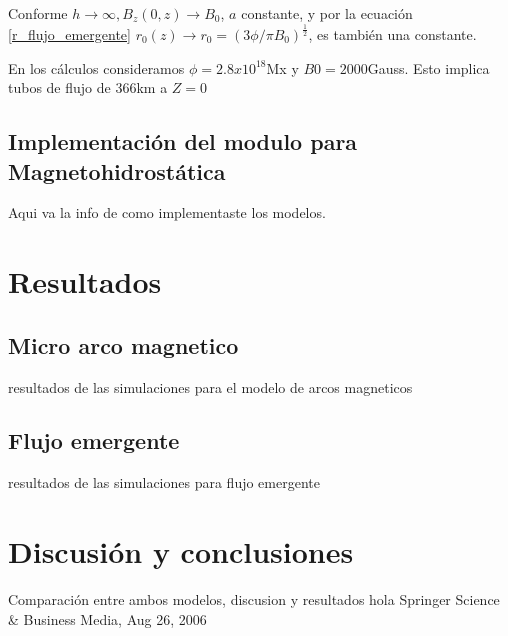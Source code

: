 \documentclass[9pt]{book}
\begin{document}
Conforme $h\rightarrow \infty , B_z(0,z) \rightarrow B_0$, $a$ constante, y por la ecuaci\'on \ref{r_flujo_emergente} $r_0(z) \rightarrow r_0 = (3\phi / \pi B_0)^\frac{1}{2}$, es tambi\'en una constante.

En los c\'alculos consideramos $\phi=2.8x10^18$Mx y $B0=2000$Gauss. Esto implica tubos de flujo de 366km a $Z=0$


\section{Implementaci\'on del modulo para Magnetohidrost\'atica}
Aqui va la info de como implementaste los modelos.


\chapter{Resultados}
\section{Micro arco magnetico}
resultados de las simulaciones para el modelo de arcos magneticos
\section{Flujo emergente}
resultados de las simulaciones para flujo emergente


\chapter{Discusi\'on y conclusiones}
Comparaci\'on entre ambos modelos, discusion y resultados
hola Springer Science \& Business Media, Aug 26, 2006
\end{document}

